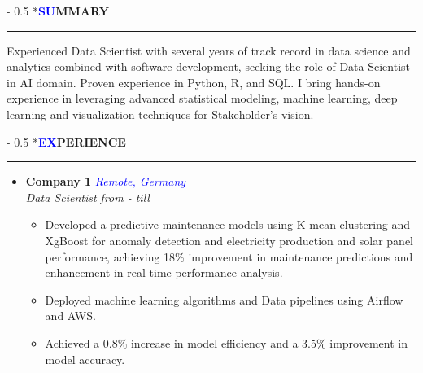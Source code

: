 \documentclass{article}
\makeatletter
\renewcommand{\section}{\@startsection{section}{1}{0mm}%
                                {-\baselineskip}%
                                {0.5\baselineskip}%
                                {\normalfont\small\bfseries}}
\makeatother
\begin{document}
\par %



\section*{{\textbf{\textcolor{blue}{SU}}\textbf{\textcolor{darktext}{MMARY}}}}
\hrule
Experienced Data Scientist with several years of track record in data science and analytics combined with software development, seeking the role of Data Scientist in AI domain. Proven experience in Python, R, and SQL. I bring hands-on experience in leveraging advanced statistical modeling, machine learning, deep learning and visualization 
 techniques for Stakeholder's vision.

\section*{{\textbf{\textcolor{blue}{EX}}\textbf{\textcolor{darktext}{PERIENCE}}}}
\hrule

\begin{itemize}[left=0pt]
  \item \textbf{Company 1} \hfill \textcolor{blue}{\emph{Remote, Germany}} \\
  \emph{Data Scientist \hfill from - till}
  \begin{itemize}
    \item Developed a predictive maintenance models using K-mean clustering and XgBoost for anomaly detection and electricity production and solar panel performance, achieving 18\% improvement in maintenance predictions and enhancement in real-time performance analysis.
    \item Deployed machine learning algorithms and Data pipelines using Airflow and AWS. 
    \item  Achieved a 0.8\% increase in model efficiency and a 3.5\% improvement in model accuracy.
  \end{itemize}
\end{itemize}
\end{document}
